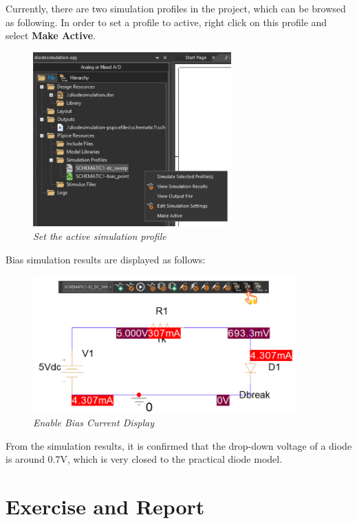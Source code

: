 Currently, there are two simulation profiles in the project, which can be browsed as following. In order to set a profile to active, right click on this profile and select \textbf{Make Active}.

\begin{figure}[!htp]
    \centering
    \includegraphics[width=3in]{source/picture/bai_2/diode_5.PNG}
    \caption{\textit{Set the active simulation profile}}
    \label{bai2_pic18e}
\end{figure}

Bias simulation results are displayed as follows:

\begin{figure}[!htp]
    \centering
    \includegraphics[width=4in]{source/picture/bai_2/21_EnableBiasCurrentDisplay.png}
    \caption{\textit{Enable Bias Current Display}}
    \label{bai2_pic21}
\end{figure}

From the simulation results, it is confirmed that the drop-down voltage of a diode is around 0.7V, which is very closed to the practical diode model.


\newpage
\section{Exercise and Report}
